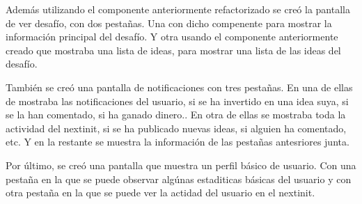 Además utilizando el componente anteriormente refactorizado se creó la pantalla de ver desafío, con dos pestañas. Una con dicho compenente 
para mostrar la información principal del desafío. Y otra usando el componente anteriormente creado que mostraba una lista de ideas, para 
mostrar una lista de las ideas del desafío.

También se creó una pantalla de notificaciones con tres pestañas. En una de ellas de mostraba las notificaciones del usuario, si se ha invertido en una idea suya, si se la han comentado, si ha ganado dinero.. En otra de ellas se mostraba toda la actividad del 
nextinit, si se ha publicado nuevas ideas, si alguien ha comentado, etc. Y en la restante se muestra la información de las pestañas 
antesriores junta.

Por último, se creó una pantalla que muestra un perfil básico de usuario. Con una pestaña en la que se puede observar algúnas estaditicas básicas del usuario y con otra pestaña en la que se puede ver la actidad del usuario en el nextinit.


